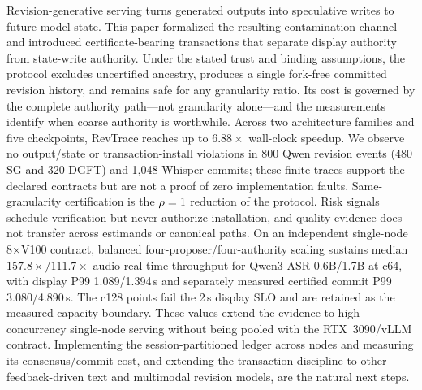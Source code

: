 
Revision-generative serving turns generated outputs into speculative writes
to future model state. This paper formalized the resulting contamination
channel and introduced certificate-bearing transactions that separate
display authority from state-write authority. Under the stated trust and
binding assumptions, the protocol excludes uncertified ancestry, produces a
single fork-free committed revision history, and remains safe for any
granularity ratio. Its cost is governed by the complete authority path---not
granularity alone---and the measurements identify when coarse authority is
worthwhile. Across two architecture families and five checkpoints, RevTrace
reaches up to $6.88\times$ wall-clock speedup. We observe no output/state or
transaction-install violations in 800 Qwen revision events (480 SG and 320
DGFT) and 1{,}048 Whisper commits; these finite traces support the declared
contracts but are not a proof of zero implementation faults. Same-granularity
certification is the $\rho=1$ reduction of the protocol. Risk signals
schedule verification but never authorize installation, and quality evidence
does not transfer across estimands or canonical paths.
On an independent single-node 8$\times$V100 contract, balanced
four-proposer/four-authority scaling sustains median
$157.8\times/111.7\times$ audio real-time throughput for Qwen3-ASR 0.6B/1.7B
at c64, with display P99 1.089/1.394\,s and separately measured certified
commit P99 3.080/4.890\,s. The c128 points fail the 2\,s display SLO and are
retained as the measured capacity boundary. These values
extend the evidence to high-concurrency single-node serving without being
pooled with the RTX~3090/vLLM contract.
Implementing the session-partitioned ledger across nodes and measuring its
consensus/commit cost, and extending the transaction discipline to other
feedback-driven text and multimodal revision models, are the natural next
steps.
